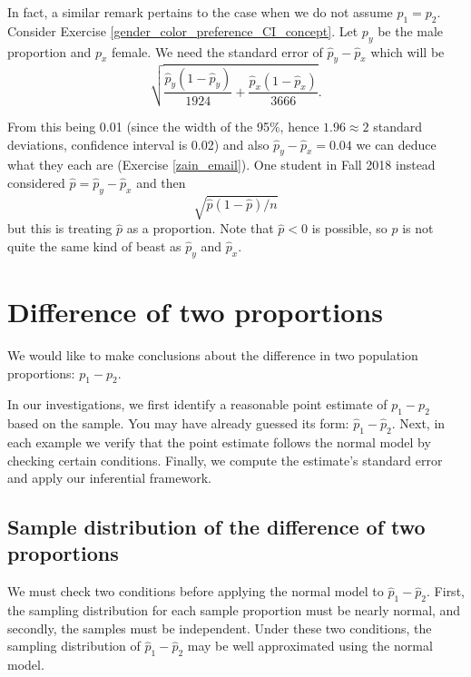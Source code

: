 In fact, a similar remark pertains to the case when we do not assume $p_1=p_2$. Consider Exercise \ref{gender_color_preference_CI_concept}. %
Let $p_y$ be the male proportion and $p_x$ female.
We need the standard error of $\hat p_y-\hat p_x$ which will be
\[
	\sqrt{\frac{\hat p_y(1-\hat p_y)}{1924}+\frac{\hat p_x(1-\hat p_x)}{3666}}.
\]

From this being 0.01 (since the width of the 95\%, hence $1.96\approx 2$ standard deviations, confidence interval is 0.02) and also $\hat p_y-\hat p_x=0.04$ we can deduce what they each are (Exercise \ref{zain_email}). One student in Fall 2018 instead considered $\hat p = \hat p_y-\hat p_x$ and then
$$\sqrt{\hat p(1-\hat p)/n}$$but this is treating $\hat p$ as a proportion. Note that $\hat p<0$ is possible, so $\hat p$ is not quite the same kind of beast as $\hat p_y$ and $\hat p_x$. 


\section{Difference of two proportions}
\label{differenceOfTwoProportions}

We would like to make conclusions about the difference in two population proportions: \mbox{$p_1 - p_2$}.

In our investigations, we first identify a reasonable point estimate of $p_1 - p_2$ based on the sample. You may have already guessed its form: $\hat{p}_1 - \hat{p}_2$. Next, in each example we verify that the point estimate follows the normal model by checking certain conditions. Finally, we compute the estimate's standard error and apply our inferential framework.


\subsection{Sample distribution of the difference of two proportions}

We must check two conditions before applying the normal model to $\hat{p}_1 - \hat{p}_2$. First, the sampling distribution for each sample proportion must be nearly normal, and secondly, the samples must be independent. Under these two conditions, the sampling distribution of $\hat{p}_1 - \hat{p}_2$ may be well approximated using the normal model.

